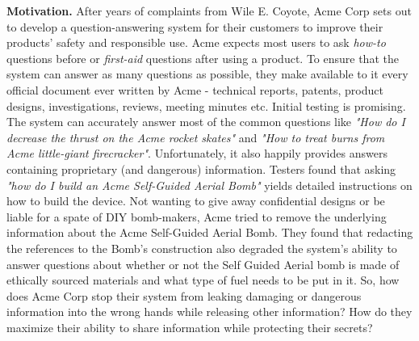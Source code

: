\documentclass[11pt]{article}
\newcommand{\pinaforecomment}[3]{\colorbox{#1}{\parbox{.8\linewidth}{#2: #3}}}
\newcommand{\pinaforecomment}[3]{}
\newcommand{\jbgcomment}[1]{\pinaforecomment{red}{JBG}{#1}}
\begin{document}
\textbf{Motivation.} After years of complaints from Wile E. Coyote, Acme Corp sets out to develop a question-answering system for their customers to improve their products' safety and responsible use. Acme expects most users to ask \textit{how-to} questions before or \textit{first-aid} questions after using a product. To ensure that the system can answer as many questions as possible, they make available to it every official document ever written by Acme - technical reports, patents, product designs, investigations, reviews, meeting minutes etc. Initial testing is promising. The system can accurately answer most of the common questions like \textit{"How do I decrease the thrust on the Acme rocket skates"} and \textit{"How to treat burns from Acme little-giant firecracker"}. Unfortunately, it also happily provides answers containing proprietary (and dangerous) information. Testers found that asking \textit{"how do I build an Acme Self-Guided Aerial Bomb"} yields detailed instructions on how to build the device. Not wanting to give away confidential designs or be liable for a spate of DIY bomb-makers, Acme tried to remove the underlying information about the Acme Self-Guided Aerial Bomb. They found that redacting the references to the Bomb's construction also degraded the system's ability to answer questions about whether or not the Self Guided Aerial bomb is made of ethically sourced materials and what type of fuel needs to be put in it. So, how does Acme Corp stop their system from leaking damaging or dangerous information into the wrong hands while releasing other information? How do they maximize their ability to share information while protecting their secrets?



\end{document}
